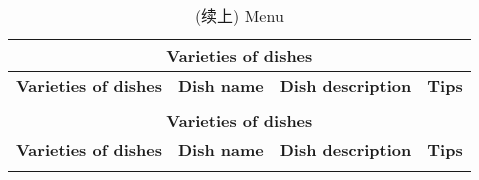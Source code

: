 \begin{longtable}{|p{2cm}|p{2cm}|p{5cm}|p{5cm}|}
    \caption{Menu} \\
    \hline
    \multicolumn{4}{|c|}{\textbf{Varieties of dishes}} \\
    \hline
    \textbf{Varieties of dishes} & \textbf{Dish name} & \textbf{Dish description} & \textbf{Tips} \\
    \hline
    \endfirsthead
    
    \caption[]{(续上) Menu} \\
    \hline
    \multicolumn{4}{|c|}{\textbf{Varieties of dishes}} \\
    \hline
    \textbf{Varieties of dishes} & \textbf{Dish name} & \textbf{Dish description} & \textbf{Tips} \\
    \hline
    \endhead
    
    \hline
    \endfoot
    
    \hline
    \endlastfoot
    

\end{longtable}
